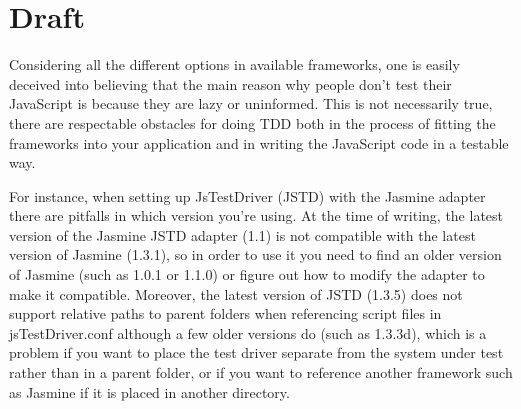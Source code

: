 \documentclass[11pt]{article}
\begin{document}

\section{Draft}

Considering all the different options in available frameworks, one is easily deceived into believing that the main reason why people don't test their JavaScript is because they are lazy or uninformed. This is not necessarily true, there are respectable obstacles for doing TDD both in the process of fitting the frameworks into your application and in writing the JavaScript code in a testable way.

For instance, when setting up JsTestDriver (JSTD) with the Jasmine adapter there are pitfalls in which version you're using. At the time of writing, the latest version of the Jasmine JSTD adapter (1.1) is not compatible with the latest version of Jasmine (1.3.1), so in order to use it you need to find an older version of Jasmine (such as 1.0.1 or 1.1.0) or figure out how to modify the adapter to make it compatible. Moreover, the latest version of JSTD (1.3.5) does not support relative paths to parent folders when referencing script files in jsTestDriver.conf although a few older versions do (such as 1.3.3d), which is a problem if you want to place the test driver separate from the system under test rather than in a parent folder, or if you want to reference another framework such as Jasmine if it is placed in another directory.
\end{document}
